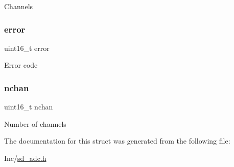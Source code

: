 Channels \mbox{\label{structsd__adc__dev_a9585f7c65cacfde431ff801e5f68ea4b}} 
\subsubsection{\texorpdfstring{error}{error}}
{\footnotesize\ttfamily uint16\+\_\+t error}

Error code \mbox{\label{structsd__adc__dev_a89df740891e8c1f7060a630afead9a43}} 
\subsubsection{\texorpdfstring{nchan}{nchan}}
{\footnotesize\ttfamily uint16\+\_\+t nchan}

Number of channels 

The documentation for this struct was generated from the following file\+:\begin{DoxyCompactItemize}
\item 
Inc/\mbox{\hyperlink{sd__adc_8h}{sd\+\_\+adc.\+h}}\end{DoxyCompactItemize}
